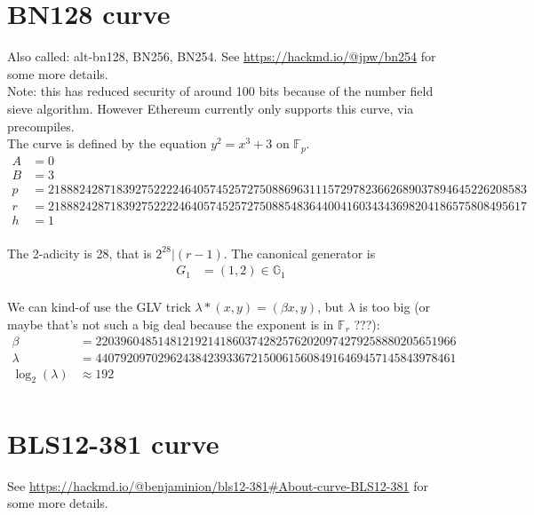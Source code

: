 \documentclass[12pt,draft,a4paper,openany,oneside]{amsbook}
\def\F{\mathbb{F}}
\def\G{\mathbb{G}}
\theoremstyle{plain}
\theoremstyle{definition}
\begin{document}
\section{BN128 curve}

Also called: alt-bn128, BN256, BN254.
See \url{https://hackmd.io/@jpw/bn254} for some more details. \\

Note: this has reduced security of around 100 bits because of the number field sieve
algorithm. However Ethereum currently only supports this curve, via precompiles.\\

The curve is defined by the equation $y^2 = x^3 + 3$ on $\F_p$.
\begin{align*}
A &= 0 \\
B &= 3 \\
p &= 21888242871839275222246405745257275088696311157297823662689037894645226208583 \\
r &= 21888242871839275222246405745257275088548364400416034343698204186575808495617 \\
h &= 1 \\
\end{align*}

The 2-adicity is 28, that is $2^{28} | (r-1)$. The canonical generator is
\begin{align*}
G_1 &= (1,2)\in\G_1  \\
\end{align*}

We can kind-of use the GLV trick $\lambda*(x,y)=(\beta x,y)$, but $\lambda$ is too big
(or maybe that's not such a big deal because the exponent is in $\F_r$ ???):
\begin{align*}
\beta   &= 2203960485148121921418603742825762020974279258880205651966 \\
\lambda &= 4407920970296243842393367215006156084916469457145843978461 \\
\log_2(\lambda) &\approx 192 \\
\end{align*}


\section{BLS12-381 curve}

See \url{https://hackmd.io/@benjaminion/bls12-381#About-curve-BLS12-381} for 
some more details.\\
\end{document}
